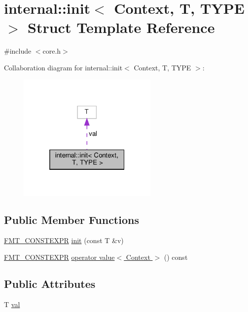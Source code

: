 \hypertarget{structinternal_1_1init}{}\section{internal\+:\+:init$<$ Context, T, T\+Y\+PE $>$ Struct Template Reference}
\label{structinternal_1_1init}


{\ttfamily \#include $<$core.\+h$>$}



Collaboration diagram for internal\+:\+:init$<$ Context, T, T\+Y\+PE $>$\+:
\nopagebreak
\begin{figure}[H]
\begin{center}
\leavevmode
\includegraphics[width=193pt]{structinternal_1_1init__coll__graph}
\end{center}
\end{figure}
\subsection*{Public Member Functions}
\begin{DoxyCompactItemize}
\item 
\hyperlink{core_8h_a69201cb276383873487bf68b4ef8b4cd}{F\+M\+T\+\_\+\+C\+O\+N\+S\+T\+E\+X\+PR} \hyperlink{structinternal_1_1init_a87332b62836494da6623b1abf36fa2b9}{init} (const T \&v)
\item 
\hyperlink{core_8h_a69201cb276383873487bf68b4ef8b4cd}{F\+M\+T\+\_\+\+C\+O\+N\+S\+T\+E\+X\+PR} \hyperlink{structinternal_1_1init_ae658b1b48dc7f8fef0ef1f51adde57c0}{operator value$<$ Context $>$} () const
\end{DoxyCompactItemize}
\subsection*{Public Attributes}
\begin{DoxyCompactItemize}
\item 
T \hyperlink{structinternal_1_1init_ae4d091cc19f078cdb2f55a91704c5e87}{val}
\end{DoxyCompactItemize}
